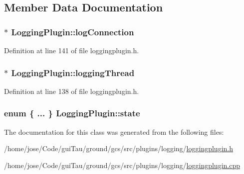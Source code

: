 \subsection{Member Data Documentation}
\hypertarget{class_logging_plugin_aa8ec59a3e026606b2e503ff2644c9e64}{
\subsubsection[{log\-Connection}]{$\ast$ Logging\-Plugin\-::log\-Connection\hspace{0.3cm}{\ttfamily [protected]}}}\label{class_logging_plugin_aa8ec59a3e026606b2e503ff2644c9e64}


Definition at line 141 of file loggingplugin.\-h.

\hypertarget{class_logging_plugin_a0e2c95cb5a17fd852e075212993e4ba3}{
\subsubsection[{logging\-Thread}]{$\ast$ Logging\-Plugin\-::logging\-Thread\hspace{0.3cm}{\ttfamily [protected]}}}\label{class_logging_plugin_a0e2c95cb5a17fd852e075212993e4ba3}


Definition at line 138 of file loggingplugin.\-h.

\hypertarget{class_logging_plugin_afed116d3400891dfe3abbe8ab2865285}{
\subsubsection[{state}]{\setlength{\rightskip}{0pt plus 5cm}enum \{ ... \}   Logging\-Plugin\-::state\hspace{0.3cm}{\ttfamily [protected]}}}\label{class_logging_plugin_afed116d3400891dfe3abbe8ab2865285}


The documentation for this class was generated from the following files\-:\begin{DoxyCompactItemize}
\item 
/home/jose/\-Code/gui\-Tau/ground/gcs/src/plugins/logging/\hyperlink{loggingplugin_8h}{loggingplugin.\-h}\item 
/home/jose/\-Code/gui\-Tau/ground/gcs/src/plugins/logging/\hyperlink{loggingplugin_8cpp}{loggingplugin.\-cpp}\end{DoxyCompactItemize}
